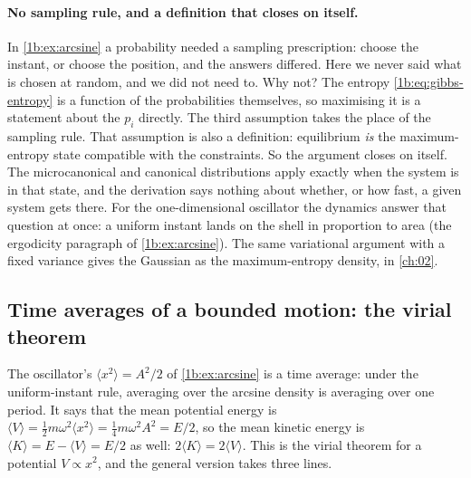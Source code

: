 \paragraph{No sampling rule, and a definition that closes on itself.}
In \cref{1b:ex:arcsine} a probability needed a sampling prescription: choose the
instant, or choose the position, and the answers differed. Here we never said what
is chosen at random, and we did not need to. Why not? The entropy
\eqref{1b:eq:gibbs-entropy} is a function of the probabilities themselves, so
maximising it is a statement about the $p_i$ directly. The third assumption
takes the place of the sampling rule. That assumption is also a definition:
equilibrium \emph{is} the maximum-entropy state compatible with the
constraints. So the argument closes on itself. The microcanonical and
canonical distributions apply exactly when the system is in that state, and
the derivation says nothing about whether, or how fast, a given system gets
there. For the one-dimensional oscillator the dynamics answer that question
at once: a uniform instant lands on the shell in proportion to area (the
ergodicity paragraph of \cref{1b:ex:arcsine}). The same variational argument with a fixed variance gives
the Gaussian as the maximum-entropy density, in \cref{ch:02}.

\subsection{Time averages of a bounded motion: the virial theorem}
\label{1b:sec:virial}

The oscillator's $\langle x^2\rangle=A^2/2$ of \cref{1b:ex:arcsine} is a time
average: under the uniform-instant rule, averaging over the arcsine density is
averaging over one period. It says that the mean potential energy is
$\langle V\rangle=\frac12m\omega^2\langle x^2\rangle=\frac14m\omega^2A^2=E/2$, so the
mean kinetic energy is $\langle K\rangle=E-\langle V\rangle=E/2$ as well:
$2\langle K\rangle=2\langle V\rangle$. This is the virial theorem for a potential
$V\propto x^2$, and the general version takes three lines.


